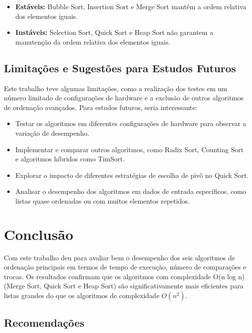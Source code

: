 \documentclass[tcc2]{uftex}
\begin{document}
\begin{itemize}
  \item \textbf{Estáveis:} Bubble Sort, Insertion Sort e Merge Sort mantêm a ordem relativa dos elementos iguais.
  \item \textbf{Instáveis:} Selection Sort, Quick Sort e Heap Sort não garantem a manutenção da ordem relativa dos elementos iguais.
\end{itemize}

\section{Limitações e Sugestões para Estudos Futuros}
Este trabalho teve algumas limitações, como a realização dos testes em um número limitado de configurações de hardware e a exclusão de outros algoritmos de ordenação avançados. Para estudos futuros, seria interessante:

\begin{itemize}
  \item Testar os algoritmos em diferentes configurações de hardware para observar a variação de desempenho.
  \item Implementar e comparar outros algoritmos, como Radix Sort, Counting Sort e algoritmos híbridos como TimSort.
  \item Explorar o impacto de diferentes estratégias de escolha de pivô no Quick Sort.
  \item Analisar o desempenho dos algoritmos em dados de entrada específicos, como listas quase ordenadas ou com muitos elementos repetidos.
\end{itemize}


\chapter{Conclusão}

Com este trabalho deu para avaliar bem o desempenho dos seis algoritmos de ordenação principais em termos de tempo de execução, número de comparações e trocas. Os resultados confirmam que os algoritmos com complexidade O(n log n) (Merge Sort, Quick Sort e Heap Sort) são significativamente mais eficientes para listas grandes do que os algoritmos de complexidade $O(n^2)$.

\section*{Recomendações}
\end{document}
